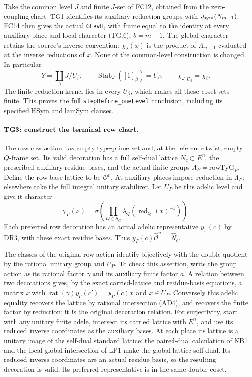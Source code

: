 Take the common level $J$ and finite $J$-set of FC12, obtained
from the zero-coupling chart. TG1 identifies its auxiliary
reduction groups with $J_{\rm sym}(N_{m-1})$. FC14 then gives
the actual \texttt{GLevH}, with frame equal to the identity at
every auxiliary place and local character (TG.6), $b=m-1$.
The global character retains the source's inverse convention:
$\chi_J(x)$ is the product of $\Lambda_{m-1}$ evaluated at the
inverse reductions of $x$. None of the common-level construction
is changed. In particular
\[
 Y=\coprod_\beta J/U_\beta,\qquad
 \operatorname{Stab}_J([1]_\beta)=U_\beta,
 \qquad \chi_J|_{U_\beta}=\chi_\beta.
 \tag{TG.7}
\]
The finite reduction kernel lies in every $U_\beta$, which makes
all these coset sets finite. This proves the full
\texttt{stepBefore\_oneLevel} conclusion, including its specified
$\mathrm{HSym}$ and $\mathrm{lamSym}$ clauses.

\paragraph{TG3: construct the terminal row chart.}
The raw row action has empty type-prime set and, at the reference
twist, empty $Q$-frame set. Its valid decoration has a full
self-dual lattice $N_c\subset E^n$, the prescribed auxiliary
residue bases, and the actual finite groups
$\Lambda_P=\mathrm{rowTyG}_P$. Define the row base lattice to be
$\mathcal O^n$. At auxiliary places impose reduction in
$\Lambda_P$; elsewhere take the full integral unitary stabilizer.
Let $U_P$ be this adelic level and give it character
\[
 \chi_P(x)=\sigma\!\left(
       \prod_{Q\in S_G}\lambda_Q(\operatorname{red}_Q(x)^{-1})
                         \right).
 \tag{TG.8}
\]
Each preferred row decoration has an actual adelic representative
$y_P(c)$ by DR3, with these exact residue bases. Thus
$y_P(c)\widehat{\mathcal O}^{n}=\widehat N_c$.

The classes of the original row action identify bijectively with
the double quotient by the rational unitary group and $U_P$.
To check this assertion, write the group action as its rational
factor $\gamma$ and its auxiliary finite factor $a$. A relation
between two decorations gives, by the exact carried-lattice and
residue-basis equations, a matrix $x$ with
$\operatorname{rat}(\gamma)y_P(c')=y_P(c)x$ and $x\in U_P$.
Conversely this adelic equality recovers the lattice by rational
intersection (AD4), and recovers the finite factor by reduction;
it is the original decoration relation. For surjectivity, start
with any unitary finite adele, intersect its carried lattice
with $E^n$, and use its reduced inverse coordinates as the
auxiliary bases. At each place its lattice is a unitary image of
the self-dual standard lattice; the paired-dual calculation of
NB1 and the local-global intersection of LP1 make the global
lattice self-dual. Its reduced inverse coordinates are an actual
residue basis, so the resulting decoration is valid. Its preferred
representative is in the same double coset.

